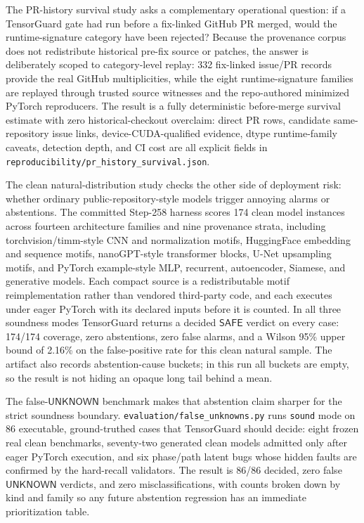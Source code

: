 \documentclass[11pt]{article}
\newcommand{\tg}{TensorGuard}
\newcommand{\unknown}{\ensuremath{\mathsf{UNKNOWN}}}
\newcommand{\safe}{\ensuremath{\mathsf{SAFE}}}
\begin{document}
The PR-history survival study asks a complementary operational question: if a
TensorGuard gate had run before a fix-linked GitHub PR merged, would the
runtime-signature category have been rejected?  Because the provenance corpus
does not redistribute historical pre-fix source or patches, the answer is
deliberately scoped to category-level replay: 332 fix-linked issue/PR records
provide the real GitHub multiplicities, while the eight runtime-signature
families are replayed through trusted source witnesses and the repo-authored
minimized PyTorch reproducers.  The result is a fully deterministic before-merge
survival estimate with zero historical-checkout overclaim: direct PR rows,
candidate same-repository issue links, device-CUDA-qualified evidence, dtype
runtime-family caveats, detection depth, and CI cost are all explicit fields in
\texttt{reproducibility/pr\_history\_survival.json}.

The clean natural-distribution study checks the other side of deployment risk:
whether ordinary public-repository-style models trigger annoying alarms or
abstentions.  The committed Step-258 harness scores 174 clean model instances
across fourteen architecture families and nine provenance strata, including
torchvision/timm-style CNN and normalization motifs, HuggingFace embedding and
sequence motifs, nanoGPT-style transformer blocks, U-Net upsampling motifs, and
PyTorch example-style MLP, recurrent, autoencoder, Siamese, and generative
models.  Each compact source is a redistributable motif reimplementation rather
than vendored third-party code, and each executes under eager PyTorch with its
declared inputs before it is counted.  In all three soundness modes \tg{}
returns a decided \safe{} verdict on every case: 174/174 coverage, zero
abstentions, zero false alarms, and a Wilson 95\% upper bound of 2.16\% on the
false-positive rate for this clean natural sample.  The artifact also records
abstention-cause buckets; in this run all buckets are empty, so the result is
not hiding an opaque long tail behind a mean.

The false-\unknown{} benchmark makes that abstention claim sharper for the
strict soundness boundary.  \texttt{evaluation/false\_unknowns.py} runs
\texttt{sound} mode on 86 executable, ground-truthed cases that \tg{} should
decide: eight frozen real clean benchmarks, seventy-two generated clean models
admitted only after eager PyTorch execution, and six phase/path latent bugs whose
hidden faults are confirmed by the hard-recall validators.  The result is
86/86 decided, zero false \unknown{} verdicts, and zero misclassifications, with
counts broken down by kind and family so any future abstention regression has an
immediate prioritization table.
\end{document}
